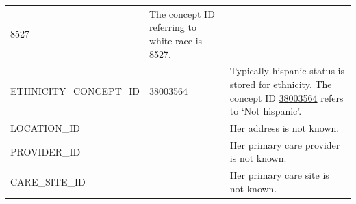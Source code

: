 \documentclass[]{book}
\begin{document}
\begin{longtable}[]{@{}lll@{}}
\begin{minipage}[t]{0.16\columnwidth}
8527\strut
\end{minipage} & \begin{minipage}[t]{0.42\columnwidth}\raggedright\strut
The concept ID referring to white race is
\href{http://athena.ohdsi.org/search-terms/terms/8527}{8527}.\strut
\end{minipage}\tabularnewline
\begin{minipage}[t]{0.33\columnwidth}\raggedright\strut
ETHNICITY\_CONCEPT\_ID\strut
\end{minipage} & \begin{minipage}[t]{0.16\columnwidth}\raggedright\strut
38003564\strut
\end{minipage} & \begin{minipage}[t]{0.42\columnwidth}\raggedright\strut
Typically hispanic status is stored for ethnicity. The concept ID
\href{http://athena.ohdsi.org/search-terms/terms/38003564}{38003564}
refers to `Not hispanic'.\strut
\end{minipage}\tabularnewline
\begin{minipage}[t]{0.33\columnwidth}\raggedright\strut
LOCATION\_ID\strut
\end{minipage} & \begin{minipage}[t]{0.16\columnwidth}\raggedright\strut
\strut
\end{minipage} & \begin{minipage}[t]{0.42\columnwidth}\raggedright\strut
Her address is not known.\strut
\end{minipage}\tabularnewline
\begin{minipage}[t]{0.33\columnwidth}\raggedright\strut
PROVIDER\_ID\strut
\end{minipage} & \begin{minipage}[t]{0.16\columnwidth}\raggedright\strut
\strut
\end{minipage} & \begin{minipage}[t]{0.42\columnwidth}\raggedright\strut
Her primary care provider is not known.\strut
\end{minipage}\tabularnewline
\begin{minipage}[t]{0.33\columnwidth}\raggedright\strut
CARE\_SITE\_ID\strut
\end{minipage} & \begin{minipage}[t]{0.16\columnwidth}\raggedright\strut
\strut
\end{minipage} & \begin{minipage}[t]{0.42\columnwidth}\raggedright\strut
Her primary care site is not known.\strut
\end{minipage}\tabularnewline

\end{longtable}
\end{document}
